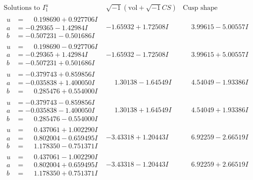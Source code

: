 \documentclass[1p]{elsarticle_modified}
\theoremstyle{definition}
\newcommand{\I}{\sqrt{-1}}
\begin{document}
$$\begin{array}{c|c|c}  
\text{Solutions to }I^u_{1}& \I (\text{vol} + \sqrt{-1}CS) & \text{Cusp shape}\\
 \hline 
\begin{aligned}
u &= \phantom{-}0.198690 + 0.927706 I \\
a &= -0.29365 - 1.42984 I \\
b &= -0.507231 - 0.501686 I\end{aligned}
 & -1.65932 + 1.72508 I & \phantom{-}3.99615 - 5.00557 I \\ \hline\begin{aligned}
u &= \phantom{-}0.198690 - 0.927706 I \\
a &= -0.29365 + 1.42984 I \\
b &= -0.507231 + 0.501686 I\end{aligned}
 & -1.65932 - 1.72508 I & \phantom{-}3.99615 + 5.00557 I \\ \hline\begin{aligned}
u &= -0.379743 + 0.859856 I \\
a &= -0.035838 + 1.400050 I \\
b &= \phantom{-}0.285476 + 0.554000 I\end{aligned}
 & \phantom{-}1.30138 - 1.64549 I & \phantom{-}4.54049 - 1.93386 I \\ \hline\begin{aligned}
u &= -0.379743 - 0.859856 I \\
a &= -0.035838 - 1.400050 I \\
b &= \phantom{-}0.285476 - 0.554000 I\end{aligned}
 & \phantom{-}1.30138 + 1.64549 I & \phantom{-}4.54049 + 1.93386 I \\ \hline\begin{aligned}
u &= \phantom{-}0.437061 + 1.002290 I \\
a &= \phantom{-}0.802004 - 0.659495 I \\
b &= \phantom{-}1.178350 - 0.751371 I\end{aligned}
 & -3.43318 + 1.20443 I & \phantom{-}6.92259 - 2.66519 I \\ \hline\begin{aligned}
u &= \phantom{-}0.437061 - 1.002290 I \\
a &= \phantom{-}0.802004 + 0.659495 I \\
b &= \phantom{-}1.178350 + 0.751371 I\end{aligned}
 & -3.43318 - 1.20443 I & \phantom{-}6.92259 + 2.66519 I \\ \hline\begin{aligned}

\end{aligned}
\end{array}$$
\end{document}
